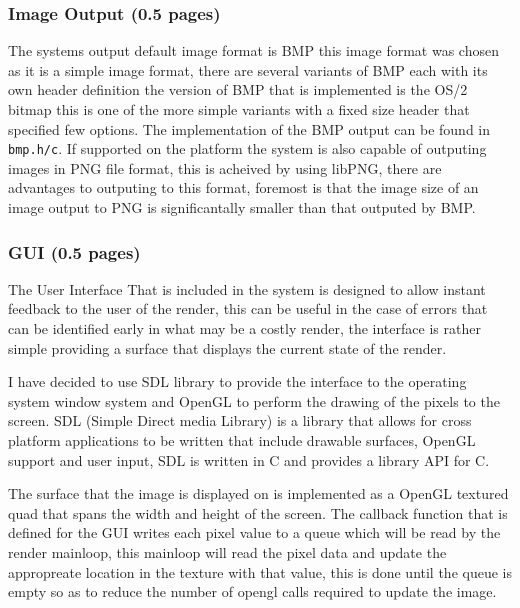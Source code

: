 \subsubsection{Image Output (0.5 pages)}

The systems output default image format is BMP this image format was chosen as it is a simple image format, there are
several variants of BMP each with its own header definition the version of BMP that is implemented is the OS/2 bitmap this is
one of the more simple variants with a fixed size header that specified few options. The implementation of the BMP output can
be found in \texttt{bmp.h/c}. If supported on the platform the system is also capable of outputing images in PNG file format,
this is acheived by using libPNG, there are advantages to outputing to this format, foremost is that the image size of an
image output to PNG is significantally smaller than that outputed by BMP.


\subsubsection{GUI (0.5 pages)}

The User Interface That is included in the system is designed to allow instant feedback to the user of the render, this can be
useful in the case of errors that can be identified early in what may be a costly render, the interface is rather simple
providing a surface that displays the current state of the render.

I have decided to use SDL library to provide the interface to the operating system window system and OpenGL to perform the 
drawing of the pixels to the screen. SDL (Simple Direct media Library) is a library that allows for cross platform applications to be written that include
drawable surfaces, OpenGL support and user input, SDL is written in C and provides a library API for C.

The surface that the image is displayed on is implemented as a OpenGL textured quad that spans the width and height of the screen.
The callback function that is defined for the GUI writes each pixel value to a queue which will be read by the render mainloop,
this mainloop will read the pixel data and update the appropreate location in the texture with that value, this is done until the
queue is empty so as to reduce the number of opengl calls required to update the image.

